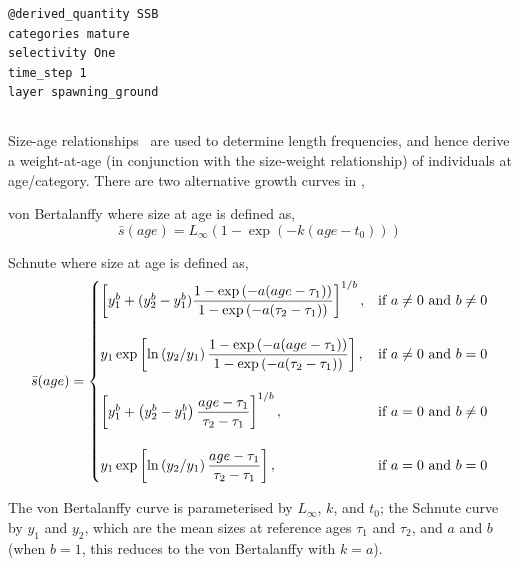 \begin{verbatim}
@derived_quantity SSB
categories mature
selectivity One
time_step 1
layer spawning_ground
\end{verbatim}

\subsection{\label{sec:size-at-age}}

Size-age relationships \NYI\ are used to determine length frequencies, and hence derive a  weight-at-age (in conjunction with the size-weight relationship) of individuals at age/category. There are two alternative growth curves in \SPM, 

\begin{description}
\item{von Bertalanffy} where size at age is defined as,
\begin{equation} 
\bar{s}(age)= L_\infty \left( 1 - \exp \left( -k \left(age-t_0 \right) \right) \right)
\end{equation}

\item{Schnute} where size at age is defined as,
\begin{equation}
\bar{s}(age)=\displaystyle\begin{cases}
  \left[ y_1^b + (y_2^b - y_1^b) \dfrac{1-\exp \left(-a(age - \tau_1) \right)}{1-\exp \left(-a(\tau_2 - \tau_1) \right)} \right]^{1/b}, & \text{if $a\ne0$ and $b\ne0$} \\
  \AddVspace
  y_1 \exp \left[ \ln \left( y_2 / y_1 \right) \dfrac{1-\exp \left(-a(age - \tau_1) \right)}{1-\exp \left(-a(\tau_2 - \tau_1) \right)} \right], & \text{if $a\ne0$ and $b=0$} \\
  \AddVspace
  \left[ y_1^b + \left( y_2^b - y_1^b \right) \dfrac{age-\tau_1}{\tau_2 - \tau_1} \right]^{1/b}, & \text{if $a=0$ and $b\ne0$} \\
  \AddVspace
  y_1 \exp \left[ \ln \left( y_2/y_1 \right) \dfrac{age-\tau_1}{\tau_2 - \tau_1} \right] , & \text{if $a=0$ and $b=0$} \\
  \end{cases}
\end{equation}
\end{description}

The von Bertalanffy curve is parameterised by $L_\infty$, $k$, and $t_0$; the Schnute curve \citep{836} by $y_1$ and $y_2$, which are the mean sizes at reference ages $\tau_1$ and $\tau_2$, and $a$ and $b$ (when $b=1$, this reduces to the von Bertalanffy with $k=a$). 

